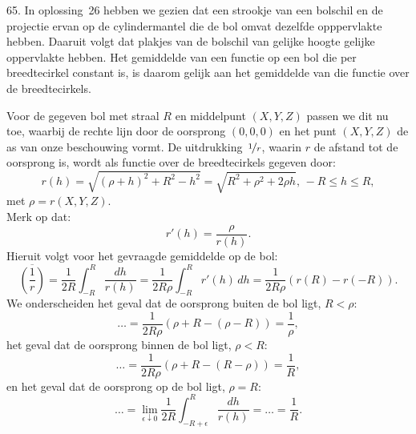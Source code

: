 \begin{problem}{65.}
	In oplossing~26 hebben we gezien dat een strookje van een bol\-schil en de projectie ervan op de cylindermantel die de bol omvat dezelfde opppervlakte hebben. Daaruit volgt dat plakjes van de bol\-schil van gelijke hoogte gelijke oppervlakte hebben. Het gemiddelde van een functie op een bol die per breedtecirkel constant is, is daarom gelijk aan het gemiddelde van die functie over de breedtecirkels.

    Voor de gegeven bol met straal $R$ en middelpunt $(X,Y,Z)$ passen we dit nu toe, waarbij de rechte lijn door de oorsprong $(0,0,0)$ en het punt $(X,Y,Z)$ de as van onze beschouwing vormt. De uitdrukking~$\nicefrac{1}{r}$, waarin $r$ de afstand tot de oorsprong is, wordt als functie over de breedtecirkels gegeven door:
    \begin{equation*}
        r(h) = \sqrt{(\rho + h)^2 + R^2 - h^2} = \sqrt{R^2 + \rho^2 + 2 \rho h},\, -R \leq h \leq R,
    \end{equation*}
    met $\rho = r(X,Y,Z)$.\\
    Merk op dat:
    \begin{equation*}
        r'(h) = \frac{\rho}{r(h)}.
    \end{equation*}
    Hieruit volgt voor het gevraagde gemiddelde op de bol:
    \begin{equation*}
        \overline{\left( \frac{1}{r} \right)} = \frac{1}{2 R} \int_{-R}^{R} \frac{dh}{r(h)} = \frac{1}{2 R \rho} \int_{-R}^{R} r'(h) \,dh = \frac{1}{2 R \rho} (r(R) - r(-R)).
    \end{equation*}
    We onderscheiden het geval dat de oorsprong buiten de bol ligt, $R < \rho$:
    \begin{equation*}
        \dots = \frac{1}{2 R \rho} (\rho + R - (\rho - R)) = \frac{1}{\rho},
    \end{equation*}
    het geval dat de oorsprong binnen de bol ligt, $\rho < R$:
    \begin{equation*}
        \dots = \frac{1}{2 R \rho} (\rho + R - (R - \rho)) = \frac{1}{R},
    \end{equation*}
    en het geval dat de oorsprong op de bol ligt, $\rho = R$:
    \begin{equation*}
        \dots = \lim_{\epsilon \downarrow 0} \frac{1}{2 R} \int_{-R + \epsilon}^{R} \frac{dh}{r(h)} = \dots = \frac{1}{R}.
    \end{equation*}
\end{problem}

\clearpage

